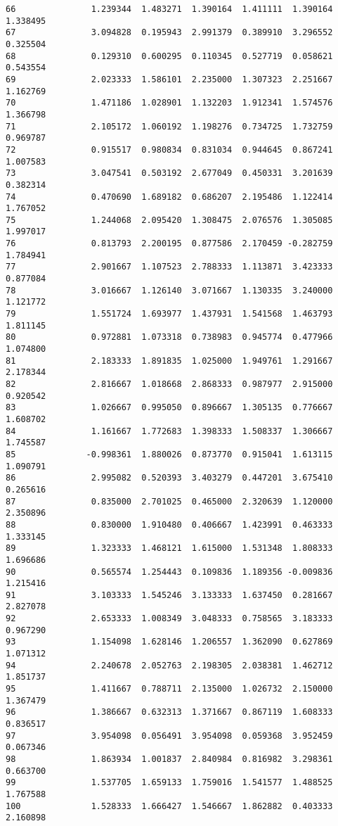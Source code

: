 \documentclass[11pt]{article}
\begin{document}
\begin{Verbatim}[commandchars=\\\{\}]
66               1.239344  1.483271  1.390164  1.411111  1.390164  1.338495
67               3.094828  0.195943  2.991379  0.389910  3.296552  0.325504
68               0.129310  0.600295  0.110345  0.527719  0.058621  0.543554
69               2.023333  1.586101  2.235000  1.307323  2.251667  1.162769
70               1.471186  1.028901  1.132203  1.912341  1.574576  1.366798
71               2.105172  1.060192  1.198276  0.734725  1.732759  0.969787
72               0.915517  0.980834  0.831034  0.944645  0.867241  1.007583
73               3.047541  0.503192  2.677049  0.450331  3.201639  0.382314
74               0.470690  1.689182  0.686207  2.195486  1.122414  1.767052
75               1.244068  2.095420  1.308475  2.076576  1.305085  1.997017
76               0.813793  2.200195  0.877586  2.170459 -0.282759  1.784941
77               2.901667  1.107523  2.788333  1.113871  3.423333  0.877084
78               3.016667  1.126140  3.071667  1.130335  3.240000  1.121772
79               1.551724  1.693977  1.437931  1.541568  1.463793  1.811145
80               0.972881  1.073318  0.738983  0.945774  0.477966  1.074800
81               2.183333  1.891835  1.025000  1.949761  1.291667  2.178344
82               2.816667  1.018668  2.868333  0.987977  2.915000  0.920542
83               1.026667  0.995050  0.896667  1.305135  0.776667  1.608702
84               1.161667  1.772683  1.398333  1.508337  1.306667  1.745587
85              -0.998361  1.880026  0.873770  0.915041  1.613115  1.090791
86               2.995082  0.520393  3.403279  0.447201  3.675410  0.265616
87               0.835000  2.701025  0.465000  2.320639  1.120000  2.350896
88               0.830000  1.910480  0.406667  1.423991  0.463333  1.333145
89               1.323333  1.468121  1.615000  1.531348  1.808333  1.696686
90               0.565574  1.254443  0.109836  1.189356 -0.009836  1.215416
91               3.103333  1.545246  3.133333  1.637450  0.281667  2.827078
92               2.653333  1.008349  3.048333  0.758565  3.183333  0.967290
93               1.154098  1.628146  1.206557  1.362090  0.627869  1.071312
94               2.240678  2.052763  2.198305  2.038381  1.462712  1.851737
95               1.411667  0.788711  2.135000  1.026732  2.150000  1.367479
96               1.386667  0.632313  1.371667  0.867119  1.608333  0.836517
97               3.954098  0.056491  3.954098  0.059368  3.952459  0.067346
98               1.863934  1.001837  2.840984  0.816982  3.298361  0.663700
99               1.537705  1.659133  1.759016  1.541577  1.488525  1.767588
100              1.528333  1.666427  1.546667  1.862882  0.403333  2.160898

\end{Verbatim}
\end{document}
